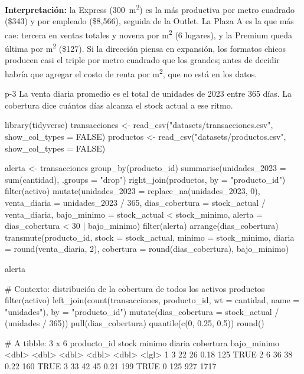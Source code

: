 \textbf{Interpretación:} la Express (300~m\textsuperscript{2}) es la más
productiva por metro cuadrado (\$343) y por empleado (\$8,566), seguida de la
Outlet. La Plaza A es la que más cae: tercera en ventas totales y novena por
m\textsuperscript{2} (6 lugares), y la Premium queda última por
m\textsuperscript{2} (\$127). Si la dirección piensa en expansión, los
formatos chicos producen casi el triple por metro cuadrado que los grandes;
antes de decidir habría que agregar el costo de renta por
m\textsuperscript{2}, que no está en los datos.


\begin{solucion}{p-3}
La venta diaria promedio es el total de unidades de 2023 entre 365 días. La
cobertura dice cuántos días alcanza el stock actual a ese ritmo.
\end{solucion}

\begin{rcode}
library(tidyverse)
transacciones <- read_csv("datasets/transacciones.csv",
                          show_col_types = FALSE)
productos <- read_csv("datasets/productos.csv", show_col_types = FALSE)

alerta <- transacciones %
  group_by(producto_id) %
  summarise(unidades_2023 = sum(cantidad), .groups = "drop") %
  right_join(productos, by = "producto_id") %
  filter(activo) %
  mutate(unidades_2023   = replace_na(unidades_2023, 0),
         venta_diaria    = unidades_2023 / 365,
         dias_cobertura  = stock_actual / venta_diaria,
         bajo_minimo     = stock_actual < stock_minimo,
         alerta          = dias_cobertura < 30 | bajo_minimo) %
  filter(alerta) %
  arrange(dias_cobertura) %
  transmute(producto_id, stock = stock_actual, minimo = stock_minimo,
            diaria = round(venta_diaria, 2),
            cobertura = round(dias_cobertura), bajo_minimo)

alerta

# Contexto: distribución de la cobertura de todos los activos
productos %
  filter(activo) %
  left_join(count(transacciones, producto_id, wt = cantidad,
                  name = "unidades"), by = "producto_id") %
  mutate(dias_cobertura = stock_actual / (unidades / 365)) %
  pull(dias_cobertura) %
  quantile(c(0, 0.25, 0.5)) %
  round()
\end{rcode}

\begin{rsalida}
# A tibble: 3 x 6
  producto_id stock minimo diaria cobertura bajo_minimo
        <dbl> <dbl>  <dbl>  <dbl>     <dbl> <lgl>      
1           3    22     26   0.18       125 TRUE       
2           6    36     38   0.22       160 TRUE       
3          33    42     45   0.21       199 TRUE       
  0%
 125  927 1717 
\end{rsalida}

